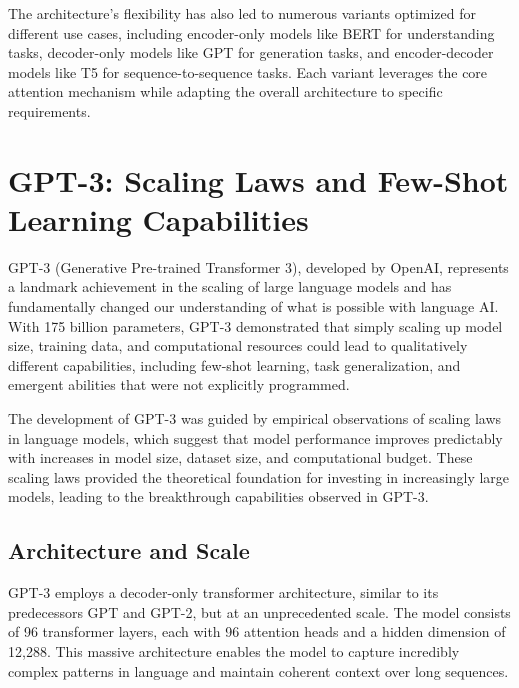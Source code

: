 The architecture's flexibility has also led to numerous variants optimized for different use cases, including encoder-only models like BERT for understanding tasks, decoder-only models like GPT for generation tasks, and encoder-decoder models like T5 for sequence-to-sequence tasks. Each variant leverages the core attention mechanism while adapting the overall architecture to specific requirements.


\section{GPT-3: Scaling Laws and Few-Shot Learning Capabilities}

GPT-3 (Generative Pre-trained Transformer 3), developed by OpenAI, represents a landmark achievement in the scaling of large language models and has fundamentally changed our understanding of what is possible with language AI. With 175 billion parameters, GPT-3 demonstrated that simply scaling up model size, training data, and computational resources could lead to qualitatively different capabilities, including few-shot learning, task generalization, and emergent abilities that were not explicitly programmed.


The development of GPT-3 was guided by empirical observations of scaling laws in language models, which suggest that model performance improves predictably with increases in model size, dataset size, and computational budget. These scaling laws provided the theoretical foundation for investing in increasingly large models, leading to the breakthrough capabilities observed in GPT-3.

\subsection{Architecture and Scale}

GPT-3 employs a decoder-only transformer architecture, similar to its predecessors GPT and GPT-2, but at an unprecedented scale. The model consists of 96 transformer layers, each with 96 attention heads and a hidden dimension of 12,288. This massive architecture enables the model to capture incredibly complex patterns in language and maintain coherent context over long sequences.

